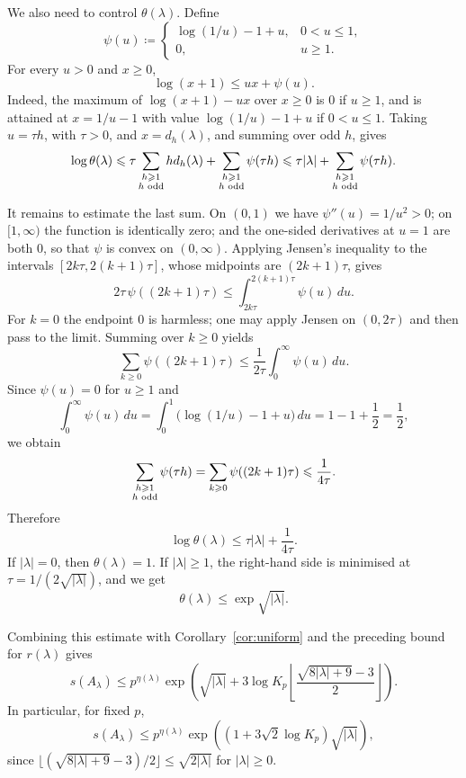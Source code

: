 \documentclass[a4paper,11pt,reqno]{amsart}
\theoremstyle{plain}
\theoremstyle{remark}
\numberwithin{equation}{section}
\renewcommand{\leq}{\leqslant}
\renewcommand{\geq}{\geqslant}
\begin{document}
We also need to control $\theta(\lambda)$. Define
\[
        \psi(u)\coloneqq
        \begin{cases}
        \log(1/u)-1+u, & 0<u\leq 1,\\
        0, & u\geq 1.
        \end{cases}
\]
For every $u>0$ and $x\geq 0$,
\[
        \log(x+1)\leq ux+\psi(u).
\]
Indeed, the maximum of $\log(x+1)-ux$ over $x\geq 0$ is $0$ if $u\geq 1$,
and is attained at $x=1/u-1$ with value $\log(1/u)-1+u$ if $0<u\leq 1$.
Taking $u=\tau h$, with $\tau>0$, and $x=d_h(\lambda)$, and summing over odd
$h$, gives
\[
        \log\theta(\lambda)
        \leq
        \tau\sum_{\substack{h\geq 1\\ h\textnormal{ odd}}}h d_h(\lambda)
        +
        \sum_{\substack{h\geq 1\\ h\textnormal{ odd}}}\psi(\tau h)
        \leq
        \tau|\lambda|+
        \sum_{\substack{h\geq 1\\ h\textnormal{ odd}}}\psi(\tau h).
\]

It remains to estimate the last sum. On $(0,1)$ we have $\psi''(u)=1/u^2>0$;
on $[1,\infty)$ the function is identically zero; and the one-sided
derivatives at $u=1$ are both $0$, so that $\psi$ is convex on $(0,\infty)$. Applying
Jensen's inequality to the intervals $[2k\tau,2(k+1)\tau]$, whose midpoints
are $(2k+1)\tau$, gives
\[
        2\tau\,\psi((2k+1)\tau)
        \leq
        \int_{2k\tau}^{2(k+1)\tau} \psi(u)\,du.
\]
For $k=0$ the endpoint $0$ is harmless; one may apply Jensen on $(0,2\tau)$
and then pass to the limit. Summing over $k\geq 0$ yields
\[
        \sum_{k\geq 0} \psi((2k+1)\tau)
        \leq
        \frac{1}{2\tau}\int_0^\infty \psi(u)\,du.
\]
Since $\psi(u)=0$ for $u\geq 1$ and
\[
        \int_0^\infty \psi(u)\,du
        =
        \int_0^1\bigl(\log(1/u)-1+u\bigr)\,du
        =
        1-1+\frac12
        =
        \frac12,
\]
we obtain
\[
        \sum_{\substack{h\geq 1\\ h\textnormal{ odd}}}\psi(\tau h)
        =
        \sum_{k\geq 0} \psi((2k+1)\tau)
        \leq
        \frac{1}{4\tau}.
\]
Therefore
\[
        \log\theta(\lambda)\leq \tau|\lambda|+\frac{1}{4\tau}.
\]
If $|\lambda|=0$, then $\theta(\lambda)=1$. If $|\lambda|\geq 1$, the right-hand side is minimised at $\tau=1/(2\sqrt{|\lambda|})$, and we get
\[
        \theta(\lambda)\leq \exp\sqrt{|\lambda|}.
\]

Combining this estimate with Corollary~\ref{cor:uniform} and the preceding
bound for $r(\lambda)$ gives
\[
        s(A_\lambda)
        \leq
        p^{\eta(\lambda)}
        \exp\left(
        \sqrt{|\lambda|}
        +
        3\log K_p
        \left\lfloor \frac{\sqrt{8|\lambda|+9}-3}{2}\right\rfloor
        \right).
\]
In particular, for fixed $p$,
\[
        s(A_\lambda)
        \leq
        p^{\eta(\lambda)}
        \exp\left((1+3\sqrt{2}\log K_p)\sqrt{|\lambda|}\right),
\]
since
$\lfloor(\sqrt{8|\lambda|+9}-3)/2\rfloor\leq \sqrt{2|\lambda|}$ for
$|\lambda|\geq 0$.
\end{document}
